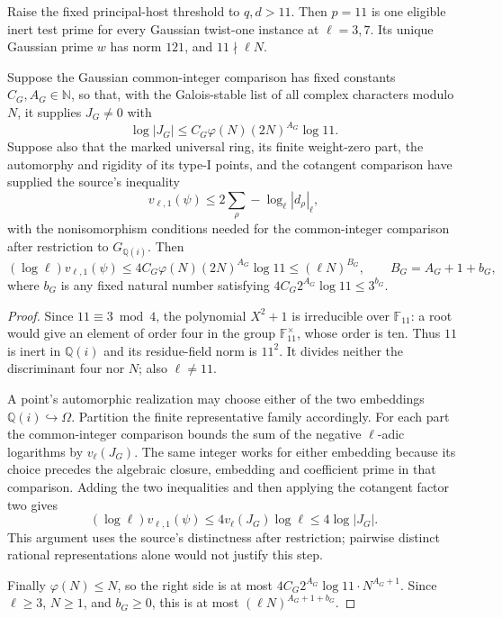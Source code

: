 \begin{srproposition}
\label{prop:sr-gaussian-fixed-prime}
Raise the fixed principal-host threshold to \(q,d>11\).
Then \(p=11\) is one eligible inert test prime for every Gaussian
twist-one instance at \(\ell=3,7\). Its unique Gaussian prime \(w\)
has norm \(121\), and \(11\nmid\ell N\).

Suppose the Gaussian common-integer comparison has fixed constants
\(C_G,A_G\in\mathbb N\), so that, with the Galois-stable list of
all complex characters modulo \(N\), it supplies \(J_G\ne0\) with
\[
              \log|J_G|
                 \leq C_G\varphi(N)(2N)^{A_G}\log11 .
\]
Suppose also that the marked universal ring, its finite weight-zero
part, the automorphy and rigidity of its type-I points, and the
cotangent comparison have supplied the source's inequality
\[
 v_{\ell,1}(\psi)
     \leq2\sum_{\rho} -\log_\ell|d_\rho|_\ell ,
\]
with the nonisomorphism conditions needed for the common-integer
comparison after restriction to \(G_{\mathbb Q(i)}\).
Then
\[
 (\log\ell)v_{\ell,1}(\psi)
        \leq4C_G\varphi(N)(2N)^{A_G}\log11
        \leq(\ell N)^{B_G},
 \qquad B_G=A_G+1+b_G,
\]
where \(b_G\) is any fixed natural number satisfying
\(4C_G2^{A_G}\log11\leq3^{b_G}\).
\end{srproposition}
\begin{proof}
Since \(11\equiv3\bmod4\), the polynomial \(X^2+1\) is irreducible
over \(\mathbb F_{11}\): a root would give an element of order four
in the group \(\mathbb F_{11}^{\times}\), whose order is ten.
Thus \(11\) is inert in \(\mathbb Q(i)\) and its residue-field norm
is \(11^2\). It divides neither the discriminant four nor \(N\);
also \(\ell\ne11\).

A point's automorphic realization may choose either of the two
embeddings \(\mathbb Q(i)\hookrightarrow\Omega\). Partition the
finite representative family accordingly. For each part the
common-integer comparison bounds the sum of the negative
\(\ell\)-adic logarithms by \(v_\ell(J_G)\).
The same integer works for either embedding because its choice
precedes the algebraic closure, embedding and coefficient prime
in that comparison. Adding the two inequalities and then applying
the cotangent factor two gives
\[
             (\log\ell)v_{\ell,1}(\psi)
                         \leq4v_\ell(J_G)\log\ell
                         \leq4\log|J_G|.
\]
This argument uses the source's distinctness after restriction;
pairwise distinct rational representations alone would not
justify this step.

Finally \(\varphi(N)\leq N\), so the right side is at most
\(4C_G2^{A_G}\log11\cdot N^{A_G+1}\).
Since \(\ell\geq3\), \(N\geq1\), and \(b_G\geq0\), this is at most
\((\ell N)^{A_G+1+b_G}\).
\end{proof}

